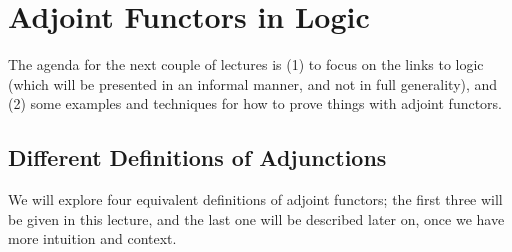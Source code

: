 \chapter{Adjoint Functors in Logic}

The agenda for the next couple of lectures is (1) to focus on the links to logic (which will be presented in an informal manner, and not in full generality), and (2) some examples and techniques for how to prove things with adjoint functors.

\section{Different Definitions of Adjunctions}
We will explore four equivalent definitions of adjoint functors; the first three will be given in this lecture, and the last one will be described later on, once we have more intuition and context.

